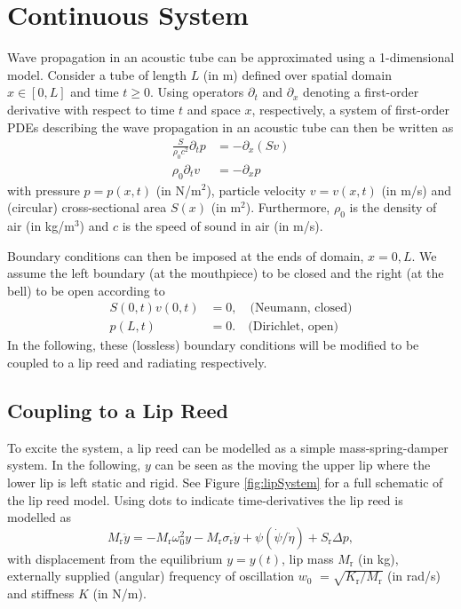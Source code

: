 \section{Continuous System}\label{sec:continuous}
Wave propagation in an acoustic tube can be approximated using a 1-dimensional model. Consider a tube of  length $L$ \SWcomment[$=L(t)$] (in m) defined over spatial domain $x\in [0, L]$ and time $t\geq 0$. Using operators $\partial_t$ and $\partial_x$ denoting a first-order derivative with respect to time $t$ and space $x$, respectively, a system of first-order PDEs describing the wave propagation in an acoustic tube can then be written as
\begin{subequations}\label{eq:firstOrderSystem}
    \begin{align}
        \frac{S}{\rho_0 c^2}\partial_t p &= -\partial_x(Sv)\label{eq:contPressure}\\
        \rho_0\partial_tv &= -\partial_xp\label{eq:contVelocity}
    \end{align}
\end{subequations}
with pressure $p = p(x,t)$ (in N/m$^2$), particle velocity $v = v(x,t)$ (in m/s) and (circular) cross-sectional area $S(x)$ (in m$^2$). Furthermore, $\rho_0$ is the density of air (in kg/m$^3$) and $c$ is the speed of sound in air (in m/s).

Boundary conditions can then be imposed at the ends of domain, $x=0, L$. We assume the left boundary (at the mouthpiece) to be closed and the right (at the bell) to be open according to  
\begin{subequations}\label{eq:contBound}
    \begin{align}
        S(0,t)v(0,t) &= 0, \quad \text{(Neumann, closed)}\label{eq:contNeumann}\\
        p(L,t) &= 0. \quad \text{(Dirichlet, open)}\label{eq:contDirichlet}
    \end{align}
\end{subequations}
In the following, these (lossless) boundary conditions will be modified to be coupled to a lip reed and radiating respectively.

\subsection{Coupling to a Lip Reed}
To excite the system, a lip reed can be modelled as a simple mass-spring-damper system. In the following, $y$ can be seen as the moving the upper lip where the lower lip is left static and rigid. See Figure \ref{fig:lipSystem} for a full schematic of the lip reed model. Using dots to indicate time-derivatives the lip reed is modelled as
\begin{equation}\label{eq:lipReedCont}
    M_\text{r}\ddot y = -M_\text{r}\omega_0^2 y - M_\text{r} \sigma_\text{r} \dot y +\psi(\dot \psi/
\dot \eta)+ S_\text{r}\Delta p,
\end{equation}
with displacement from the equilibrium $y = y(t)$, lip mass $M_\text{r}$ (in kg), externally supplied (angular) frequency of oscillation $w_0$ \SWcomment[$= w_0(t)$] $= \sqrt{K_\text{r}/M_\text{r}}$ (in rad/s) and stiffness $K$ \SWcomment[$= K(t)$] (in N/m).

